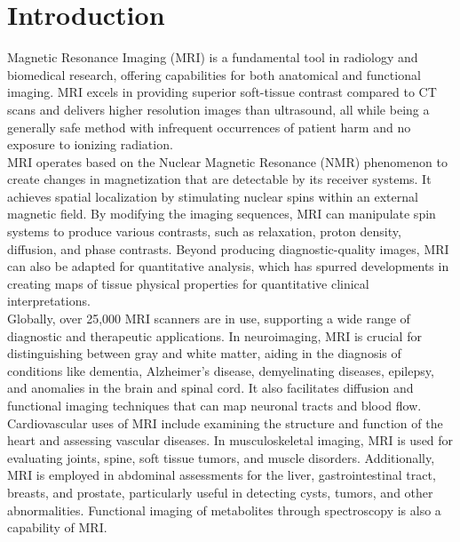 \chapter{Introduction}\label{ch:introduction}
Magnetic Resonance Imaging (MRI) is a fundamental tool in radiology and biomedical research, offering capabilities for both anatomical and functional imaging. MRI excels in providing superior soft-tissue contrast compared to CT scans and delivers higher resolution images than ultrasound, all while being a generally safe method with infrequent occurrences of patient harm \cite{incidentRates} and no exposure to ionizing radiation.\\

MRI operates based on the Nuclear Magnetic Resonance (NMR) phenomenon to create changes in magnetization that are detectable by its receiver systems. It achieves spatial localization by stimulating nuclear spins within an external magnetic field. By modifying the imaging sequences, MRI can manipulate spin systems to produce various contrasts, such as relaxation, proton density, diffusion, and phase contrasts. Beyond producing diagnostic-quality images, MRI can also be adapted for quantitative analysis, which has spurred developments in creating maps of tissue physical properties for quantitative clinical interpretations.\cite{quantitativeMri}\\

Globally, over 25,000 MRI scanners are in use, supporting a wide range of diagnostic and therapeutic applications. In neuroimaging, MRI is crucial for distinguishing between gray and white matter, aiding in the diagnosis of conditions like dementia, Alzheimer’s disease, demyelinating diseases, epilepsy, and anomalies in the brain and spinal cord. It also facilitates diffusion and functional imaging techniques that can map neuronal tracts and blood flow. Cardiovascular uses of MRI include examining the structure and function of the heart and assessing vascular diseases. In musculoskeletal imaging, MRI is used for evaluating joints, spine, soft tissue tumors, and muscle disorders. Additionally, MRI is employed in abdominal assessments for the liver, gastrointestinal tract, breasts, and prostate, particularly useful in detecting cysts, tumors, and other abnormalities. Functional imaging of metabolites through spectroscopy is also a capability of MRI.
\cite{wikipediaMri}\\

